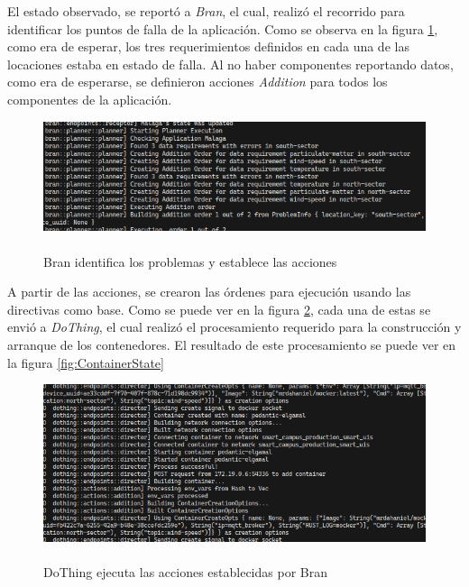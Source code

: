 El estado observado, se reportó a \textit{Bran}, el cual, realizó el recorrido para identificar los puntos de falla de la aplicación. Como se observa en la figura \ref{fig:BranPlan}, como era de esperar, los tres requerimientos definidos en cada una de las locaciones estaba en estado de falla. Al no haber componentes reportando datos, como era de esperarse, se definieron acciones \textit{Addition} para todos los componentes de la aplicación. 

\begin{figure}[ht]
    \centering
    \caption{\\Bran identifica los problemas y establece las acciones}
    \label{fig:BranPlan}
    \includegraphics[width=0.9\linewidth]{images/BranPlanning.png}
    \vspace{-4mm}
\end{figure}

A partir de las acciones, se crearon las órdenes para ejecución usando las directivas como base. Como se puede ver en la figura \ref{fig:DoThingDoing}, cada una de estas se envió a \textit{DoThing}, el cual realizó el procesamiento requerido para la construcción y arranque de los contenedores. El resultado de este procesamiento se puede ver en la figura \ref{fig:ContainerState}

\begin{figure}[ht]
    \centering
    \caption{\\DoThing ejecuta las acciones establecidas por Bran }
    \label{fig:DoThingDoing}
    \includegraphics[width=0.9\linewidth]{images/DoThingDoing.png}
    \vspace{-4mm}
\end{figure}

